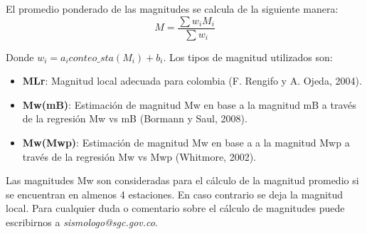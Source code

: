 \begin{exercise}
\sffamily
El promedio ponderado de las magnitudes se calcula de la siguiente manera:\\
\begin{equation*}
M = \frac{\sum w_iM_i}{\sum w_i}
\end{equation*}

Donde $w_i = a_i conteo\_sta(M_i)+b_i $. Los tipos de magnitud utilizados son:
\begin{itemize}
\item \textbf{MLr}: Magnitud local adecuada para colombia (F. Rengifo y A. Ojeda, 2004).
\item \textbf{Mw(mB)}: Estimación de magnitud Mw en base a la magnitud mB a través 
de la regresión Mw vs mB (Bormann y Saul, 2008).
\item \textbf{Mw(Mwp)}: Estimación de magnitud Mw en base a a la magnitud Mwp a través
de la regresión Mw vs Mwp (Whitmore, 2002).
\end{itemize}

\noindent
Las magnitudes Mw son consideradas para el cálculo de la magnitud promedio si se encuentran
en almenos 4 estaciones. En caso contrario se deja la magnitud local.
Para cualquier duda o comentario sobre el cálculo de magnitudes puede escribirnos a
\textit{sismologo@sgc.gov.co}.
\end{exercise}%
